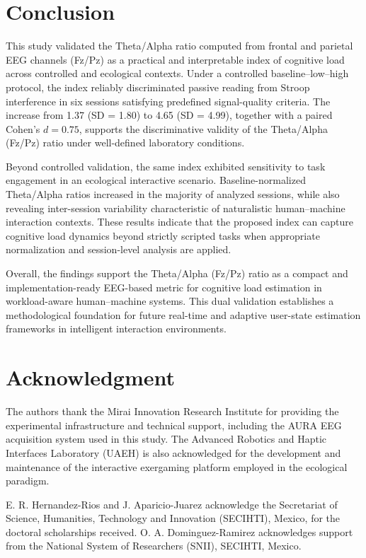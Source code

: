 \documentclass[10pt]{iopart}
\begin{document}
\section{Conclusion}

This study validated the Theta/Alpha ratio computed from frontal and parietal EEG channels (Fz/Pz) as a practical and interpretable index of cognitive load across controlled and ecological contexts. Under a controlled baseline--low--high protocol, the index reliably discriminated passive reading from Stroop interference in six sessions satisfying predefined signal-quality criteria. The increase from 1.37 (SD = 1.80) to 4.65 (SD = 4.99), together with a paired Cohen’s $d = 0.75$, supports the discriminative validity of the Theta/Alpha (Fz/Pz) ratio under well-defined laboratory conditions.

Beyond controlled validation, the same index exhibited sensitivity to task engagement in an ecological interactive scenario. Baseline-normalized Theta/Alpha ratios increased in the majority of analyzed sessions, while also revealing inter-session variability characteristic of naturalistic human--machine interaction contexts. These results indicate that the proposed index can capture cognitive load dynamics beyond strictly scripted tasks when appropriate normalization and session-level analysis are applied.

Overall, the findings support the Theta/Alpha (Fz/Pz) ratio as a compact and implementation-ready EEG-based metric for cognitive load estimation in workload-aware human--machine systems. This dual validation establishes a methodological foundation for future real-time and adaptive user-state estimation frameworks in intelligent interaction environments.

\section*{Acknowledgment}
The authors thank the Mirai Innovation Research Institute for providing the experimental infrastructure and technical support, including the AURA EEG acquisition system used in this study. The Advanced Robotics and Haptic Interfaces Laboratory (UAEH) is also acknowledged for the development and maintenance of the interactive exergaming platform employed in the ecological paradigm.

E. R. Hernandez-Rios and J. Aparicio-Juarez acknowledge the Secretariat of Science, Humanities, Technology and Innovation (SECIHTI), Mexico, for the doctoral scholarships received. O. A. Dominguez-Ramirez acknowledges support from the National System of Researchers (SNII), SECIHTI, Mexico.
\end{document}
